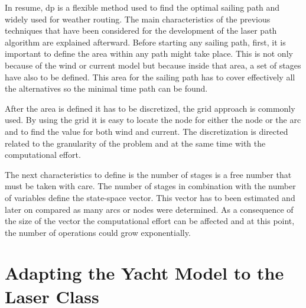 \hspace{5mm}
In resume,
\acrshort{dp} is a flexible method used to find the optimal sailing path and widely used for weather routing. The main characteristics of the previous techniques that have been considered for the development of the laser path algorithm are explained afterward. Before starting any sailing path, first, it is important to define the area within any path might take place. This is not only because of the wind or current model but because inside that area, a set of stages have also to be defined. This area for the sailing path has to cover effectively all the alternatives so the minimal time path can be found. \par 
After the area is defined it has to be discretized, the grid approach is commonly used. By using the grid it is easy to locate the node for either the node or the arc and to find the value for both wind and current. The discretization is directed related to the granularity of the problem and at the same time with the computational effort. \par 
The next characteristics to define is the number of stages is a free number that must be taken with care. The number of stages in combination with the number of variables define the state-space vector. This vector has to been estimated and later on compared as many arcs or nodes were determined. As a consequence of the size of the vector the computational effort can be affected and at this point, the number of operations could grow exponentially.

\section{Adapting the Yacht Model to the Laser Class} \label{sec:laser_yacht}

